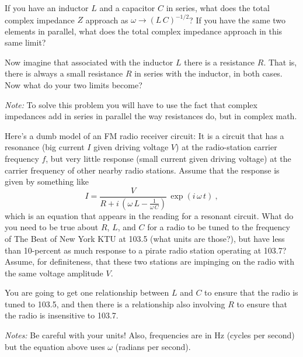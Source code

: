 \documentclass[12pt]{article}
\begin{document}
\startproblem%
If you have an inductor $L$ and a capacitor $C$ in series, what does
the total complex impedance $Z$ approach as $\omega\rightarrow
(L\,C)^{-1/2}$? If you have the same two elements in parallel, what
does the total complex impedance approach in this same limit?

Now imagine that associated with the inductor $L$ there is a
resistance $R$. That is, there is always a small resistance $R$ in
series with the inductor, in both cases. Now what do your two limits
become?

\textsl{Note:} To solve this problem you will have to use the fact that
complex impedances add in series in parallel the way resistances do, but
in complex math.


\startproblem%
Here's a dumb model of an FM radio receiver circuit: It is a circuit that has a
resonance (big current $I$ given driving voltage $V$) at the radio-station
carrier frequency $f$, but very little response (small current given
driving voltage) at the carrier frequency of other nearby radio stations.
Assume that the response is given by something like
\begin{equation}\label{eq:res}
  I = \frac{V}{R + i\,\left(\omega\,L - \frac{1}{\omega\,C}\right)}\,\exp(i\,\omega\,t) ~,
\end{equation}
which is an equation that appears in the reading for a resonant circuit.
What do you need to be true about $R$, $L$,
and $C$ for a radio to be tuned to the frequency of The Beat of New
York KTU at 103.5 (what units are those?),
but have less than 10-percent as much
response to a pirate radio station operating at 103.7? Assume, for
definiteness, that these two stations are impinging on the radio with
the same voltage amplitude $V$.

You are going to get one relationship between $L$ and
$C$ to ensure that the radio is tuned to 103.5, and then there is a
relationship also involving $R$ to ensure that the radio is
insensitive to 103.7.

\textsl{Notes:} Be careful with your units! Also, frequencies are in Hz
(cycles per second) but the equation above uses $\omega$ (radians per second).
\end{document}
